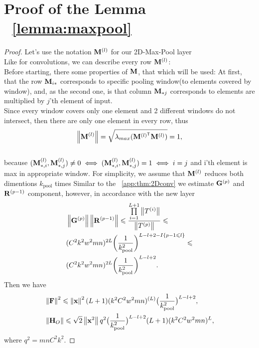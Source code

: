 \documentclass[conference]{IEEEtran}
\begin{document}
\section{Proof of the Lemma ~\ref{lemma:maxpool}}\label{app:lemma:maxpool}
\begin{proof}
Let's use the notation $\mathbf{M}^{(l)}$ for our 2D-Max-Pool layer \\
Like for convolutions, we can describe every row $\mathbf{M}^{(l)}$: \\
Before starting, there some properties of $\mathbf{M}$, that which will be used: At first, that the row $\mathbf{M}_{i*}$ corresponds to specific pooling window(to elements covered by window), and, as the second one, is that column $\mathbf{M}_{*j}$ corresponds to elements are multiplied by $j$'th element of input. \\
Since every window covers only one element and 2 different windows do not intersect, then there are only one element in every row, thus
\[\norm{\bM^{(l)}} = \sqrt{\lambda_{max}({\bM^{(l)\T} \bM^{(l)}})} = 1,\] \\
because $(\mathbf{M}^{(l)}_{*, i}, \mathbf{M}^{(l)}_{*, j}) \neq 0 \iff (\mathbf{M}^{(l)}_{*, i}, \mathbf{M}^{(l)}_{*, j}) = 1 \iff i = j $ and i'th element is max in appropriate window. For simplicity, we assume that $\mathbf{M}^{(l)}$ reduces both dimentions ${k_{\mathrm{pool}}}$ times Similar to the ~\ref{app:thm:2Dconv} we estimate $\mathbf{G}^{(p)}$ and $\mathbf{R}^{(p-1)}$ component, however, in accordance with the new layer
\begin{align*}
& \left\|\mathbf{G}^{(p)}\right\|\left\|\mathbf{R}^{(p-1)}\right\| \leqslant \frac{\prod\limits_{i=1}^{L+1}\left\|T^{(i)}\right\|}{\left\|T^{(p)}\right\|} \leqslant \\
& (C^2k^2w^2mn)^{2L}\bigg(\frac{1}{k_{\mathrm{pool}}^2}\bigg)^{L - l + 2 - I\{p-1 \leqslant l\}} \leqslant \\
& (C^2k^2w^2mn)^{2L}\bigg(\frac{1}{k_{\mathrm{pool}}^2}\bigg)^{L - l + 2}
.
\end{align*}
Then we have
\begin{align*}
& \left\|\mathbf{F}\right\|^2 \leqslant \left\|\mathbf{x}\right\|^2(L+1)(k^2C^2w^2mn)^{(L)}\big(\frac{1}{k_{\mathrm{pool}}^2}\big)^{L - l + 2}, \\
& \left\|\mathbf{H}_O\right\| \leqslant \sqrt{2}\left\|\mathbf{x}^2\right\|q^2\big(\frac{1}{k_{\mathrm{pool}}^2}\big)^{L-l+2}(L+1)(k^2C^2w^2mn)^{L},
\end{align*}
where $q^2 = mnC^2k^2.$
\end{proof}
\end{document}
